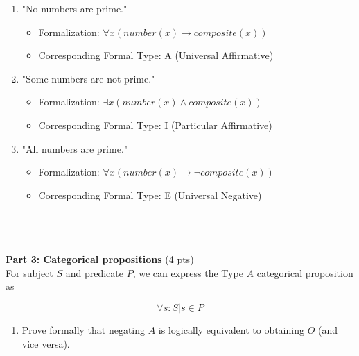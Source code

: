 \documentclass[12pt]{article}
\begin{document}
\begin{spacing}{1.5}
\begin{enumerate}
		\item "No numbers are prime."
		      		      		      		      		      		      		      
		      \begin{itemize}
		      	\item Formalization: $\forall x (number(x) \rightarrow composite(x))$
		      	\item Corresponding Formal Type: A (Universal Affirmative)
		      \end{itemize}
		      		      		      		      		      		      		        
		\item "Some numbers are not prime."
		      		      		      		      		      		      		      
		      \begin{itemize}
		      	\item Formalization: $\exists x(number(x) \land composite(x))$
		      	\item Corresponding Formal Type: I (Particular Affirmative)
		      \end{itemize}
		      		      		      		      		      		      		        
		\item "All numbers are prime."
		      		      		      		      		      		      		      
		      \begin{itemize}
		      	\item Formalization: $\forall x(number(x) \rightarrow \neg composite(x))$
		      	\item Corresponding Formal Type: E (Universal Negative) \\ \\ \\ \\
		      \end{itemize}
		      		      		      		      		      		      		              
	\end{enumerate}
							
	\noindent \textbf{Part 3: Categorical propositions} (4 pts)\\
	For subject $S$ and predicate $P$, we can express the Type $A$ categorical proposition as
							
	$$\forall s : S | s \in P$$
							
	\begin{enumerate}
		\item Prove formally that negating $A$ is logically equivalent to obtaining $O$ (and vice versa).
		      		      		      		      		      		      		      

\end{enumerate}
\end{spacing}
\end{document}
